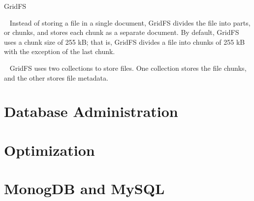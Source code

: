 \documentclass{beamer}
\begin{document}
\begin{frame}{GridFS}
\begin{block}{~}
Instead of storing a file in a single document, GridFS divides the file into parts, or chunks, and stores each chunk as a separate document. By default, GridFS uses a chunk size of 255 kB; that is, GridFS divides a file into chunks of 255 kB with the exception of the last chunk.
\end{block} 

\begin{block}{~}
    GridFS uses two collections to store files. One collection stores the file chunks, and the other stores file metadata.
\end{block}

\end{frame}

\section{Database Administration}
\begin{frame}
    
\end{frame}

\section{Optimization}
\begin{frame}
    
\end{frame}

\section{MonogDB and MySQL}
\begin{frame}
    
\end{frame}
\end{document}
